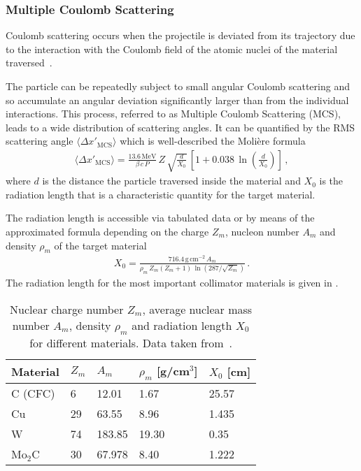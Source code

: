 \subsubsection{Multiple Coulomb Scattering}

Coulomb scattering occurs when the projectile is deviated from its trajectory due to the interaction with the Coulomb field of the atomic nuclei of the material traversed~\cite{Beringer:1900zz}. 

The particle can be repeatedly subject to small angular Coulomb scattering and so accumulate an angular deviation significantly larger than from the individual interactions. This process, referred to as Multiple Coulomb Scattering (MCS), leads to a wide distribution of scattering angles. It can be quantified by the RMS scattering angle $\langle \Delta x'_\text{MCS} \rangle$ which is well-described the Moli\`{e}re formula~\cite{Beringer:1900zz}
\begin{align}
\langle \Delta x'_\text{MCS} \rangle = \frac{13.6\,\text{MeV}}{\beta \, c \, P} \, Z \, \sqrt{\frac{d}{X_0}} \, \left[ 1 + 0.038 \, \ln \left( \frac{d}{X_0} \right) \right] \, ,
\end{align}
where $d$ is the distance the particle traversed inside the material and $X_0$ is the radiation length that is a characteristic quantity for the target material. 

The radiation length is accessible via tabulated data or by means of the approximated formula depending on the charge $Z_m$, nucleon number $A_m$ and density $\rho_m$ of the target material~\cite{Beringer:1900zz}
%
\begin{align}
  X_0 = \frac{716.4 \, \text{g} \, \text{cm}^{-2} \, A_m}{\rho_m \, Z_m (Z_m+1) \, \ln (287/\sqrt{Z_m})} \, .
\end{align}
%
The radiation length for the most important collimator materials is given in .

\begin{table}[b]
\centering
\caption{Nuclear charge number $Z_m$, average nuclear mass number $A_m$, density $\rho_m$ and radiation length $X_0$ for different materials. Data taken from~\cite{IPAC15:TUPTY029}.}
\label{tab:radiation_lengths}
\begin{tabular}{lllll}
\toprule
Material & $Z_m$ & $A_m$  & $\rho_m$ {[}g/cm$^3${]} & $X_0$ {[}cm{]}  \\ \midrule
C (CFC)  & 6     & 12.01  & 1.67                    & 25.57          \\
Cu       & 29    & 63.55  & 8.96                    & 1.435          \\
W        & 74    & 183.85 & 19.30                    & 0.35           \\
Mo$_2$C  & 30    & 67.978 & 8.40                     & 1.222         \\ \bottomrule
\end{tabular}
\end{table}

